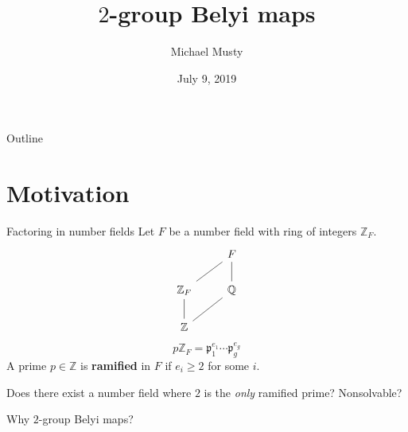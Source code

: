 \documentclass[handout,xcolor=dvipsnames]{beamer}
\title{$2$-group Belyi maps}
\author{Michael Musty}
\date{July 9, 2019}
\institute{Dartmouth College}
\theoremstyle{plain}
\newcommand{\QQ}{\mathbb Q}
\newcommand{\ZZ}{\mathbb Z}
\begin{document}
  \maketitle
  \begin{frame}{Outline}
    \tableofcontents
  \end{frame}
  \section{Motivation}{
    \begin{frame}[fragile]{Factoring in number fields}
      Let $F$ be a number field with ring
      of integers $\ZZ_F$.
      \begin{align*}
        \begin{tikzcd}[ampersand replacement=\&]
          \&F\arrow[dash]{dl}\\
          \ZZ_F\arrow[dash]{d}\&\QQ\arrow[dash]{u}\\
          \ZZ\arrow[dash]{ur}
        \end{tikzcd}
      \end{align*}
      \pause
      \[
        p\ZZ_F = \mathfrak{p}_1^{e_1}\cdots\mathfrak{p}_g^{e_g}
      \]
      \pause
      A prime $p\in\ZZ$ is \textbf{ramified} in $F$ if
      $e_i\geq 2$ for some $i$.
      \pause\par
      Does there exist a number field
      where $2$ is the \emph{only} ramified prime?
      \pause
      Nonsolvable?
    \end{frame}
    \begin{frame}[fragile]{Why $2$-group Belyi maps?}
      \begin{center}
\end{center}
\end{frame}}
\end{document}
